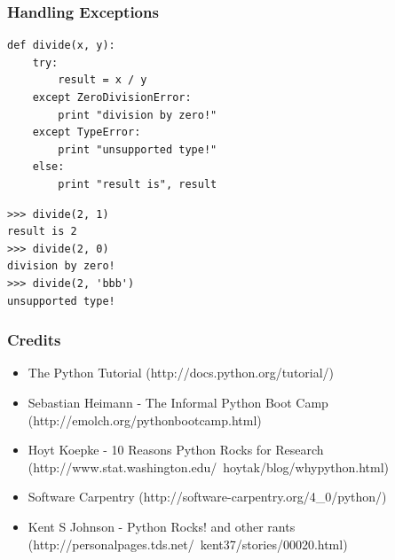 \documentclass[t,10pt,compress=false,usepdftitle=false]{beamer}
\begin{document}
\begin{frame}[fragile]
    \frametitle{Handling Exceptions}
    \begin{myColorBox}{0.9}{}
\small
\begin{verbatim}
def divide(x, y):
    try:
        result = x / y
    except ZeroDivisionError:
        print "division by zero!"
    except TypeError:
        print "unsupported type!"
    else:
        print "result is", result
\end{verbatim}
    \end{myColorBox}
    \begin{myColorBox}{0.9}{}
\small
\begin{verbatim}
>>> divide(2, 1)
result is 2
>>> divide(2, 0)
division by zero!
>>> divide(2, 'bbb')
unsupported type!
\end{verbatim}
    \end{myColorBox}
\end{frame}

\begin{frame}[fragile]
\frametitle {Credits}
    \begin{itemize}
    \item The Python Tutorial (http://docs.python.org/tutorial/)
    \item Sebastian Heimann - The Informal Python Boot Camp (http://emolch.org/pythonbootcamp.html)
    \item Hoyt Koepke - 10 Reasons Python Rocks for Research (http://www.stat.washington.edu/~hoytak/blog/whypython.html)
    \item Software Carpentry (http://software-carpentry.org/4\_0/python/)
    \item Kent S Johnson - Python Rocks! and other rants (http://personalpages.tds.net/~kent37/stories/00020.html)
    \end{itemize}
\end{frame}

\end{document}
